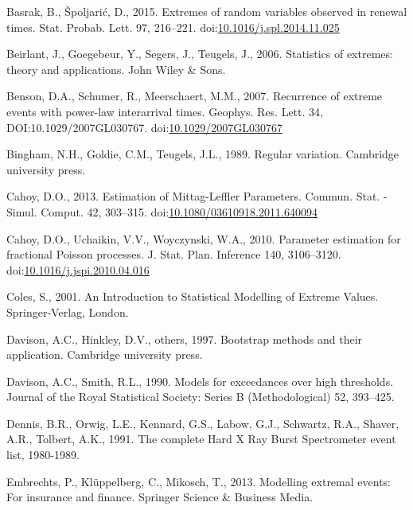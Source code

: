 \documentclass[]{elsarticle} %
\begin{document}
\leavevmode\hypertarget{ref-Basrak2014}{}%
Basrak, B., Špoljarić, D., 2015. Extremes of random variables observed
in renewal times. Stat. Probab. Lett. 97, 216--221.
doi:\href{https://doi.org/10.1016/j.spl.2014.11.025}{10.1016/j.spl.2014.11.025}

\leavevmode\hypertarget{ref-beirlantBook}{}%
Beirlant, J., Goegebeur, Y., Segers, J., Teugels, J., 2006. Statistics
of extremes: theory and applications. John Wiley \& Sons.

\leavevmode\hypertarget{ref-Benson2007}{}%
Benson, D.A., Schumer, R., Meerschaert, M.M., 2007. Recurrence of
extreme events with power-law interarrival times. Geophys. Res. Lett.
34, DOI:10.1029/2007GL030767.
doi:\href{https://doi.org/10.1029/2007GL030767}{10.1029/2007GL030767}

\leavevmode\hypertarget{ref-BinghamGoldieTeugels}{}%
Bingham, N.H., Goldie, C.M., Teugels, J.L., 1989. Regular variation.
Cambridge university press.

\leavevmode\hypertarget{ref-Cahoy2013}{}%
Cahoy, D.O., 2013. Estimation of Mittag-Leffler Parameters. Commun.
Stat. - Simul. Comput. 42, 303--315.
doi:\href{https://doi.org/10.1080/03610918.2011.640094}{10.1080/03610918.2011.640094}

\leavevmode\hypertarget{ref-Cahoy2010}{}%
Cahoy, D.O., Uchaikin, V.V., Woyczynski, W.A., 2010. Parameter
estimation for fractional Poisson processes. J. Stat. Plan. Inference
140, 3106--3120.
doi:\href{https://doi.org/10.1016/j.jspi.2010.04.016}{10.1016/j.jspi.2010.04.016}

\leavevmode\hypertarget{ref-ColesBook}{}%
Coles, S., 2001. An Introduction to Statistical Modelling of Extreme
Values. Springer-Verlag, London.

\leavevmode\hypertarget{ref-davison1997bootstrap}{}%
Davison, A.C., Hinkley, D.V., others, 1997. Bootstrap methods and their
application. Cambridge university press.

\leavevmode\hypertarget{ref-davison1990models}{}%
Davison, A.C., Smith, R.L., 1990. Models for exceedances over high
thresholds. Journal of the Royal Statistical Society: Series B
(Methodological) 52, 393--425.

\leavevmode\hypertarget{ref-HXRBS}{}%
Dennis, B.R., Orwig, L.E., Kennard, G.S., Labow, G.J., Schwartz, R.A.,
Shaver, A.R., Tolbert, A.K., 1991. The complete Hard X Ray Burst
Spectrometer event list, 1980-1989.

\leavevmode\hypertarget{ref-embrechts2013modelling}{}%
Embrechts, P., Klüppelberg, C., Mikosch, T., 2013. Modelling extremal
events: For insurance and finance. Springer Science \& Business Media.
\end{document}

